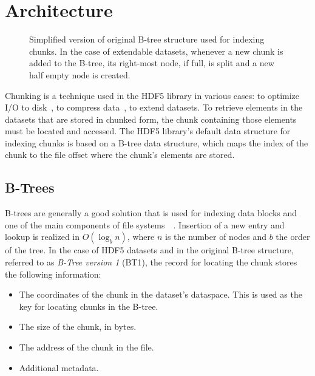 \section{Architecture}
\label{sec:architecture}

\begin{figure*}
\centering

\caption{Simplified version of original B-tree structure used for indexing 
chunks. In the case of extendable datasets, whenever a new chunk is added to 
the B-tree, its right-most node, if full, is split and a new half empty node 
is created.}
\label{fig:btree1}
\end{figure*}

Chunking is a technique used in the HDF5 library in various cases:
to optimize I/O to disk~\cite{Howison2010}, to compress data~\cite{Folk2011},
to extend datasets.
To retrieve elements in the datasets that are stored in chunked form, the 
chunk containing those elements must be located and accessed. 
The HDF5 library's default data structure for indexing chunks is based on
a B-tree data structure, which maps the index
of the chunk to the file offset where the chunk's elements are stored.

\subsection{B-Trees}

B-trees are generally a good solution that is used for indexing data blocks
and one of the main components of file systems~\cite{Comer1979}~\cite{Folk1992}. 
Insertion of a new entry and lookup is realized in $O(\log_b{n})$, where $n$ is the
number of nodes and $b$ the order of the tree.
In the case of HDF5 datasets and in the original B-tree structure, referred to
as \textit{B-Tree version 1} (BT1), the record for locating the chunk stores the
following information:
\begin{itemize}
\item The coordinates of the chunk in the dataset's dataspace. This is used
as the key for locating chunks in the B-tree.
\item The size of the chunk, in bytes.
\item The address of the chunk in the file.
\item Additional metadata.
\end{itemize}

